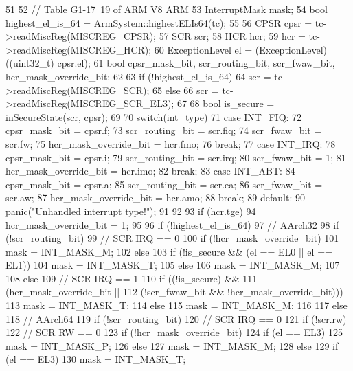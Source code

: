 \begin{DoxyCode}
51 {
52     // Table G1-17~19 of ARM V8 ARM
53     InterruptMask mask;
54     bool highest_el_is_64 = ArmSystem::highestELIs64(tc);
55 
56     CPSR cpsr = tc->readMiscReg(MISCREG_CPSR);
57     SCR scr;
58     HCR hcr;
59     hcr = tc->readMiscReg(MISCREG_HCR);
60     ExceptionLevel el = (ExceptionLevel) ((uint32_t) cpsr.el);
61     bool cpsr_mask_bit, scr_routing_bit, scr_fwaw_bit, hcr_mask_override_bit;
62 
63     if (!highest_el_is_64)
64         scr = tc->readMiscReg(MISCREG_SCR);
65     else
66         scr = tc->readMiscReg(MISCREG_SCR_EL3);
67 
68     bool is_secure = inSecureState(scr, cpsr);
69 
70     switch(int_type) {
71       case INT_FIQ:
72         cpsr_mask_bit = cpsr.f;
73         scr_routing_bit = scr.fiq;
74         scr_fwaw_bit = scr.fw;
75         hcr_mask_override_bit = hcr.fmo;
76         break;
77       case INT_IRQ:
78         cpsr_mask_bit = cpsr.i;
79         scr_routing_bit = scr.irq;
80         scr_fwaw_bit = 1;
81         hcr_mask_override_bit = hcr.imo;
82         break;
83       case INT_ABT:
84         cpsr_mask_bit = cpsr.a;
85         scr_routing_bit = scr.ea;
86         scr_fwaw_bit = scr.aw;
87         hcr_mask_override_bit = hcr.amo;
88         break;
89       default:
90         panic("Unhandled interrupt type!");
91     }
92 
93     if (hcr.tge)
94         hcr_mask_override_bit = 1;
95 
96     if (!highest_el_is_64) {
97         // AArch32
98         if (!scr_routing_bit) {
99             // SCR IRQ == 0
100             if (!hcr_mask_override_bit)
101                 mask = INT_MASK_M;
102             else {
103                 if (!is_secure && (el == EL0 || el == EL1))
104                     mask = INT_MASK_T;
105                 else
106                     mask = INT_MASK_M;
107             }
108         } else {
109             // SCR IRQ == 1
110             if ((!is_secure) &&
111                 (hcr_mask_override_bit ||
112                     (!scr_fwaw_bit && !hcr_mask_override_bit)))
113                 mask = INT_MASK_T;
114             else
115                 mask = INT_MASK_M;
116         }
117     } else {
118         // AArch64
119         if (!scr_routing_bit) {
120             // SCR IRQ == 0
121             if (!scr.rw) {
122                 // SCR RW == 0
123                 if (!hcr_mask_override_bit) {
124                     if (el == EL3)
125                         mask = INT_MASK_P;
126                     else
127                         mask = INT_MASK_M;
128                 } else {
129                     if (el == EL3)
130                         mask = INT_MASK_T;
}}}}}
\end{DoxyCode}
